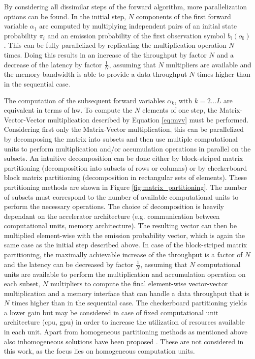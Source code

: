 \documentclass[mscthesis]{usiinfthesis}
\begin{document}
By considering all dissimilar steps of the forward algorithm, more
parallelization options can be found. In the initial step, $N$ components of
the first forward variable $\alpha_1$ are computed by multiplying independent
pairs of an initial state probability $\pi_i$ and an emission probability of
the first observation symbol $b_i(o_0)$. This can be fully parallelized by
replicating the multiplication operation $N$ times. Doing this results in an
increase of the throughput by factor $N$ and a decrease of the latency by
factor $\frac{1}{N}$, assuming that $N$ multipliers are available and the
memory bandwidth is able to provide a data throughput $N$ times higher than in
the sequential case.

The computation of the subsequent forward variables $\alpha_k$, with $k
= 2 \dots L$ are equivalent in terms of \gls{hw}. To compute the $N$ elements
of one step, the Matrix-Vector-Vector multiplication described by Equation
\ref{eq:mvv} must be performed. Considering first only the Matrix-Vector
multiplication, this can be parallelized by decomposing the matrix into
subsets and then use multiple computational units to perform multiplication
and/or accumulation operations in parallel on the subsets. An intuitive
decomposition can be done either by block-striped matrix partitioning
(decomposition into subsets of rows or columns) or by checkerboard block matrix
partitioning (decomposition in rectangular sets of elements). These
partitioning methods are shown in Figure \ref{fig:matrix_partitioning}. The
number of subsets must correspond to the number of available computational
units to perform the necessary operations. The choice of decomposition is
heavily dependant on the accelerator architecture (e.g. communication between
computational units, memory architecture). The resulting vector can then be
multiplied element-wise with the emission probability vector, which is again the
same case as the initial step described above. In case of the block-striped
matrix partitioning, the maximally achievable increase of the throughput is
a factor of $N$ and the latency can be decreased by factor $\frac{1}{N}$,
assuming that $N$ computational units are available to perform the
multiplication and accumulation operation on each subset, $N$ multipliers to
compute the final element-wise vector-vector multiplication and a memory
interface that can handle a data throughput that is $N$ times higher than in
the sequential case. The checkerboard partitioning yields a lower gain but may
be considered in case of fixed computational unit architecture (\gls{cpu},
\gls{gpu}) in order to increase the utilization of resources available in each
unit. Apart from homogeneous partitioning methods as mentioned above also
inhomogeneous solutions have been proposed \cite{IPDPSW12_DeFlumere, clarke11}.
These are not considered in this work, as the focus lies on homogeneous
computation units.
\end{document}
